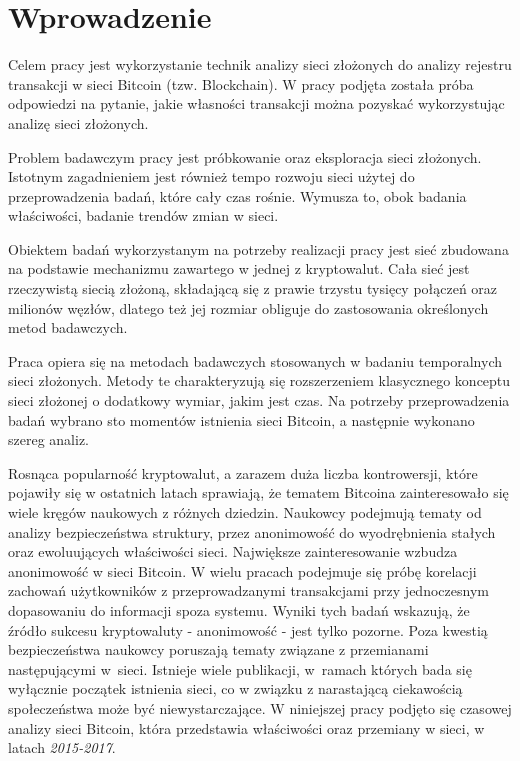\documentclass[12pt, twoside, final, openany]{mgr}
\begin{document}
\def\listtablename{Spis tabel. }
\def\tablename{Tabela. }



\chapter*{Wprowadzenie}
\vspace{-1ex}
\indent Celem pracy jest wykorzystanie technik analizy sieci złożonych do analizy rejestru transakcji w sieci Bitcoin (tzw. Blockchain). W pracy podjęta została próba odpowiedzi na pytanie, jakie własności transakcji można pozyskać wykorzystując analizę sieci złożonych.

\indent Problem badawczym pracy jest próbkowanie oraz eksploracja sieci złożonych. Istotnym zagadnieniem jest również tempo rozwoju sieci użytej do przeprowadzenia badań, które cały czas rośnie. Wymusza to, obok badania właściwości, badanie trendów zmian w sieci.

\indent Obiektem badań wykorzystanym na potrzeby realizacji pracy jest sieć zbudowana na podstawie mechanizmu zawartego w jednej z kryptowalut. Cała sieć jest rzeczywistą siecią złożoną, składającą się z prawie trzystu tysięcy połączeń oraz milionów węzłów, dlatego też jej rozmiar obliguje do zastosowania określonych metod badawczych.

\indent Praca opiera się na metodach badawczych stosowanych w badaniu temporalnych sieci złożonych. Metody te charakteryzują się rozszerzeniem klasycznego konceptu sieci złożonej o dodatkowy wymiar, jakim jest czas. Na potrzeby przeprowadzenia badań wybrano sto momentów istnienia sieci Bitcoin, a następnie wykonano szereg analiz.

\indent Rosnąca popularność kryptowalut, a zarazem duża liczba kontrowersji, które pojawiły się w ostatnich latach sprawiają, że tematem Bitcoina zainteresowało się wiele kręgów naukowych z różnych dziedzin. Naukowcy podejmują tematy od analizy bezpieczeństwa struktury, przez anonimowość do wyodrębnienia stałych oraz ewoluujących właściwości sieci. Największe zainteresowanie wzbudza anonimowość w sieci Bitcoin. W wielu pracach podejmuje się próbę korelacji zachowań użytkowników z przeprowadzanymi transakcjami przy jednoczesnym dopasowaniu do informacji spoza systemu. Wyniki tych badań wskazują, że źródło sukcesu kryptowaluty - anonimowość - jest tylko pozorne. Poza kwestią bezpieczeństwa naukowcy poruszają tematy związane z przemianami następującymi w~sieci. Istnieje wiele publikacji, w~ramach których bada się wyłącznie początek istnienia sieci, co w związku z narastającą ciekawością społeczeństwa może być niewystarczające. W niniejszej pracy podjęto się czasowej analizy sieci Bitcoin, która przedstawia właściwości oraz przemiany w sieci, w latach \textit{2015-2017}.
\end{document}

